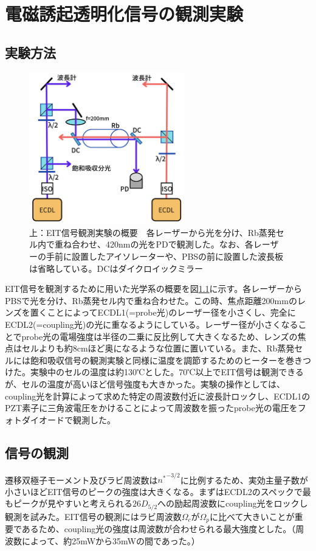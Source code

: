 \documentclass[dvipdfmx]{jsreport}
\begin{document}
\clearpage
\chapter{電磁誘起透明化信号の観測実験}
\section{実験方法}
\begin{figure}
\centering
\includegraphics[width=0.6\textwidth]{images/eit.png}
\caption{\label{fig:eit}上：EIT信号観測実験の概要　各レーザーから光を分け、Rb蒸発セル内で重ね合わせ、420nmの光をPDで観測した。なお、各レーザーの手前に設置したアイソレーターや、PBSの前に設置した波長板は省略している。DCはダイクロイックミラー}
\end{figure}
EIT信号を観測するために用いた光学系の概要を図\ref{fig:eit}に示す。各レーザーからPBSで光を分け、Rb蒸発セル内で重ね合わせた。この時、焦点距離200mmのレンズを置くことによってECDL1(=probe光)のレーザー径を小さくし、完全にECDL2(=coupling光)の光に重なるようにしている。レーザー径が小さくなることでprobe光の電場強度は半径の二乗に反比例して大きくなるため、レンズの焦点はセルよりも約8cmほど奥になるような位置に置いている。また、Rb蒸発セルには飽和吸収信号の観測実験と同様に温度を調節するためのヒーターを巻きつけた。実験中のセルの温度は約130℃とした。70℃以上でEIT信号は観測できるが、セルの温度が高いほど信号強度も大きかった。実験の操作としては、coupling光を計算によって求めた特定の周波数付近に波長計ロックし、ECDL1のPZT素子に三角波電圧をかけることによって周波数を振ったprobe光の電圧をフォトダイオードで観測した。

\section{信号の観測}
遷移双極子モーメント及びラビ周波数は${n^*}^{-3/2}$に比例するため\cite{yuma}、実効主量子数が小さいほどEIT信号のピークの強度は大きくなる。まずはECDL2のスペックで最もピークが見やすいと考えられる$26D_{5/2}$への励起周波数にcoupling光をロックし観測を試みた。EIT信号の観測にはラビ周波数$\Omega_c$が$\Omega_p$に比べて大きいことが重要であるため、coupling光の強度は周波数が合わせられる最大強度とした。（周波数によって、約25mWから35mWの間であった。）
\end{document}
